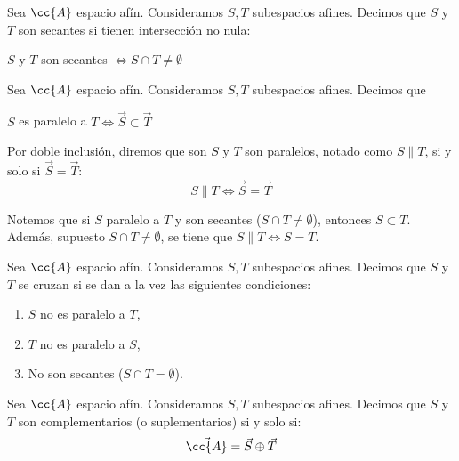 \begin{definicion}
    Sea $\cc{A}$ espacio afín. Consideramos $S,T$ subespacios afines. Decimos que $S$ y $T$ son secantes si tienen intersección no nula:
    \begin{center}
        $S$ y $T$ son secantes $\Longleftrightarrow S\cap T\neq \emptyset$
    \end{center}
\end{definicion}

\begin{definicion}[Paralelismo]
    Sea $\cc{A}$ espacio afín. Consideramos $S,T$ subespacios afines. Decimos que
    \begin{center}
        $S$ es paralelo a $T \Longleftrightarrow \vec{S}\subset \vec{T}$
    \end{center}

    Por doble inclusión, diremos que son $S$ y $T$ son paralelos, notado como $S\|T$, si y solo si $\vec{S}=\vec{T}$:
    \begin{equation*}
        S\|T\Longleftrightarrow \vec{S}=\vec{T}
    \end{equation*}
\end{definicion}

Notemos que si $S$ paralelo a $T$ y son secantes ($S\cap T\neq \emptyset$), entonces $S\subset T$. Además, supuesto $S\cap T\neq \emptyset$, se tiene que $S\|T\Longleftrightarrow S=T$.

\begin{definicion}
    Sea $\cc{A}$ espacio afín. Consideramos $S,T$ subespacios afines. Decimos que $S$ y $T$ se cruzan si se dan a la vez las siguientes condiciones:
    \begin{enumerate}
        \item $S$ no es paralelo a $T$,
        \item $T$ no es paralelo a $S$,
        \item No son secantes ($S\cap T=\emptyset$).
    \end{enumerate}
\end{definicion}


\begin{definicion}
    Sea $\cc{A}$ espacio afín. Consideramos $S,T$ subespacios afines. Decimos que $S$ y $T$ son complementarios (o suplementarios) si y solo si:
    $$\vec{\cc{A}}=\vec{S}\oplus \vec{T}$$
\end{definicion}


